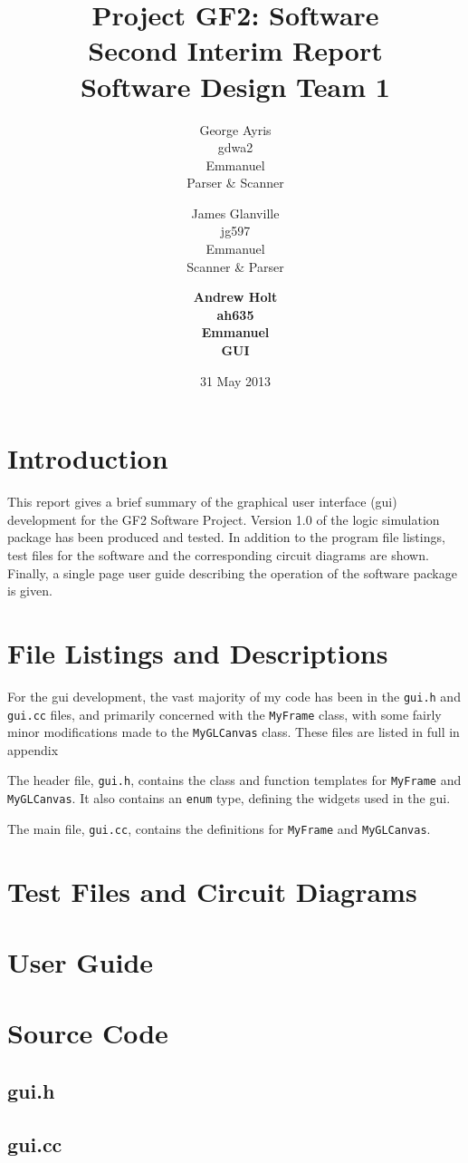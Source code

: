 \documentclass[a4paper,10pt]{article}  %
\title{Project GF2: Software\\ Second Interim Report\\ Software Design
  Team 1}
\author{George Ayris\\ gdwa2\\ Emmanuel \\ Parser \& Scanner \and James Glanville\\
jg597\\ Emmanuel \\ Scanner \& Parser \and \textbf{Andrew Holt}\\
\textbf{ah635}\\ \textbf{Emmanuel}\\ \textbf{GUI}}
\date{31 May 2013}
\begin{document}
\maketitle

\section{Introduction}
\label{sec:introduction}

This report gives a brief summary of the graphical user interface
(gui) development for the GF2 Software Project. Version 1.0 of the
logic simulation package has been produced and tested. In addition to
the program file listings, test files for the software and the
corresponding circuit diagrams are shown. Finally, a single page user
guide describing the operation of the software package is given.

\section{File Listings and Descriptions}
\label{sec:file-list-descr}

For the gui development, the vast majority of my code has been in the
\texttt{gui.h} and \texttt{gui.cc} files, and primarily concerned with
the \texttt{MyFrame} class, with some fairly minor modifications made
to the \texttt{MyGLCanvas} class. These files are listed in full in
appendix 

The header file, \texttt{gui.h}, contains the class and function
templates for \texttt{MyFrame} and \texttt{MyGLCanvas}. It also
contains an \texttt{enum} type, defining the widgets used in the gui.

The main file, \texttt{gui.cc}, contains the definitions for
\texttt{MyFrame} and \texttt{MyGLCanvas}.

\section{Test Files and Circuit Diagrams}
\label{sec:test-files-circuit}

\section{User Guide}
\label{sec:user-guide}

\newpage
\appendix

\section{Source Code}
\label{sec:source-code}

\subsection{gui.h}
\label{sec:gui.h}



\subsection{gui.cc}
\label{sec:gui.cc}


\end{document}
